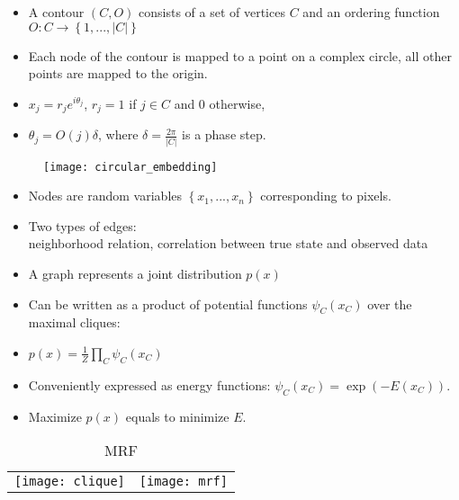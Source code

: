 \documentclass[11pt, a4paper, landscape]{article}
\begin{document}
\NewPage{}
\vfill
\begin{itemize}
\item A contour $(C, O)$ consists of a set of vertices $C$ and an ordering function $O: C \rightarrow \left\lbrace 1, ..., \lvert C \rvert \right\rbrace $
\item Each node of the contour is mapped to a point on a complex circle, all other points are mapped to the origin.
\item $x_j = r_je^{i\theta_j}$, $r_j = 1$ if $j \in C$ and 0 otherwise,
\item $\theta_j = O(j)\delta$, where $\delta = \frac{2\pi}{\lvert C \rvert}$ is a phase step.
\end{itemize}
\begin{figure}
	\centering
	\texttt{[image: circular\_embedding]}
\end{figure}
\vfill


\NewPage{}
\vfill
\begin{itemize}
\item Nodes are random variables $\left\lbrace x_1, ..., x_n \right\rbrace $ corresponding to pixels.
\item Two types of edges:\\
neighborhood relation, correlation between true state and observed data
\item A graph represents a joint distribution $p(x)$
\item Can be written as a product of potential functions $\psi_C(x_C)$ over the maximal cliques:
\item[]
	\begin{center}
		$p(x) = \frac{1}{Z} \prod\limits_{C}\psi_C(x_C)$
	\end{center}
\item Conveniently expressed as energy functions: $\psi_C(x_C) = \exp(-E(x_C))$.
\item Maximize $p(x)$ equals to minimize $E$.
\end{itemize}
\begin{table}
  \centering
  \begin{tabular}{@{} M{.5\linewidth} M{.5\linewidth} @{}}
      \texttt{[image: clique]}%
      \caption{Cliques}%
      &
      \texttt{[image: mrf]}%
      \caption{MRF}%
  \end{tabular}
\end{table}
\vfill
\end{document}
